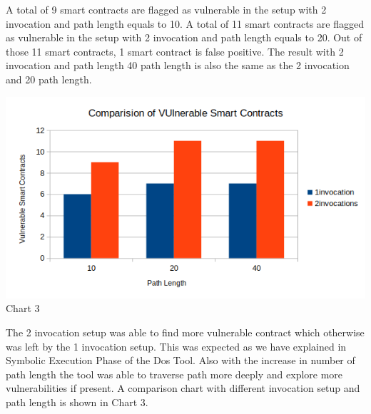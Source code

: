 \noindent A total of 9 smart contracts are flagged as vulnerable in the setup with 2 invocation and path length equals to 10. A total of 11 smart contracts are flagged as vulnerable in the setup with 2 invocation and path length equals to 20. Out of those 11 smart contracts, 1 smart contract is false positive. The result with 2 invocation and path length 40 path length is also the same as the 2 invocation and 20 path length. \\

\begin{center}
\includegraphics[width= 16cm]{images/53.png}
Chart 3
\end{center}
The 2 invocation setup was able to find more vulnerable contract which otherwise was left by the 1 invocation setup. This was expected as we have explained in Symbolic Execution Phase of the Dos Tool. Also with the increase in number of path length the tool was able to traverse path more deeply and explore more vulnerabilities if present. A comparison chart with different invocation setup and path length is shown in Chart 3.\\

